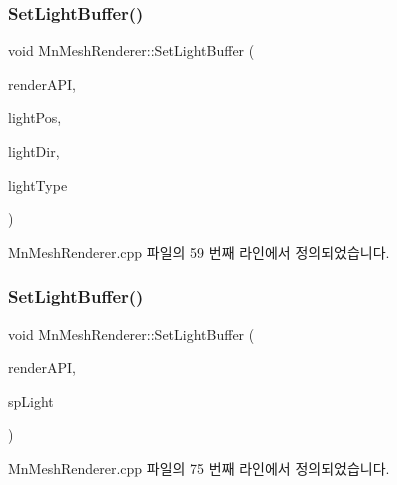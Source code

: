 \subsubsection{\texorpdfstring{Set\+Light\+Buffer()}{SetLightBuffer()}\hspace{0.1cm}{\footnotesize\ttfamily [1/2]}}
{\footnotesize\ttfamily void Mn\+Mesh\+Renderer\+::\+Set\+Light\+Buffer (\begin{DoxyParamCaption}\item[{\hyperlink{class_m_n_l_1_1_mn_render_a_p_i}{Mn\+Render\+A\+PI} \&}]{render\+A\+PI,  }\item[{const Direct\+X\+::\+Simple\+Math\+::\+Vector3 \&}]{light\+Pos,  }\item[{const Direct\+X\+::\+Simple\+Math\+::\+Vector3 \&}]{light\+Dir,  }\item[{\hyperlink{namespace_m_n_l_aac0b78de8bb8c872cb617ede813c113d}{M\+N\+\_\+\+L\+I\+G\+H\+T\+\_\+\+T\+Y\+PE}}]{light\+Type }\end{DoxyParamCaption})}



Mn\+Mesh\+Renderer.\+cpp 파일의 59 번째 라인에서 정의되었습니다.

\mbox{\label{class_m_n_l_1_1_mn_mesh_renderer_ad6faf4decf759e6da4ecefa1234aa36e}} 
\subsubsection{\texorpdfstring{Set\+Light\+Buffer()}{SetLightBuffer()}\hspace{0.1cm}{\footnotesize\ttfamily [2/2]}}
{\footnotesize\ttfamily void Mn\+Mesh\+Renderer\+::\+Set\+Light\+Buffer (\begin{DoxyParamCaption}\item[{\hyperlink{class_m_n_l_1_1_mn_render_a_p_i}{Mn\+Render\+A\+PI} \&}]{render\+A\+PI,  }\item[{const std\+::shared\+\_\+ptr$<$ \hyperlink{class_m_n_l_1_1_mn_light_source}{Mn\+Light\+Source} $>$}]{sp\+Light }\end{DoxyParamCaption})}



Mn\+Mesh\+Renderer.\+cpp 파일의 75 번째 라인에서 정의되었습니다.

